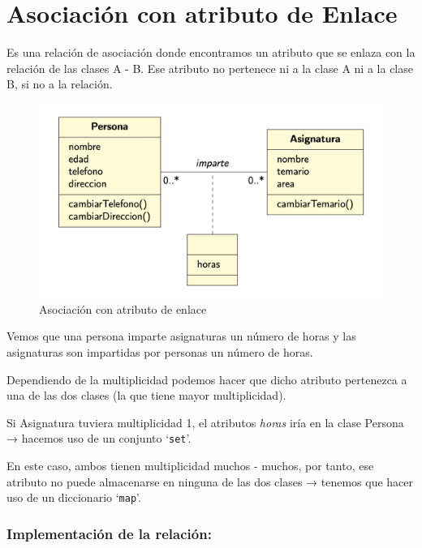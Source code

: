 \chapter{Asociación con atributo de Enlace}
Es una relación de asociación donde encontramos un atributo que se enlaza con la relación de las clases A - B.
Ese atributo no pertenece ni a la clase A ni a la clase B, si no a la relación.
\begin{figure}[h]
	\centering
	\includegraphics[width=\textwidth]{Imagenes/atribenlace.png}
	\caption{Asociación con atributo de enlace}
\end{figure}

Vemos que una persona imparte asignaturas un número de horas y las asignaturas son impartidas por personas un número de horas.

Dependiendo de la multiplicidad podemos hacer que dicho atributo pertenezca a una de las dos clases (la que tiene mayor multiplicidad).

Si Asignatura tuviera multiplicidad 1, el atributos \textit{horas} iría en la clase Persona → hacemos uso de un conjunto ‘\texttt{set}’.

En este caso, ambos tienen multiplicidad muchos - muchos, por tanto, ese atributo no puede almacenarse en ninguna de las dos clases → tenemos que hacer uso de un diccionario ‘\texttt{map}’.
\newpage
\subsection{Implementación de la relación:}

